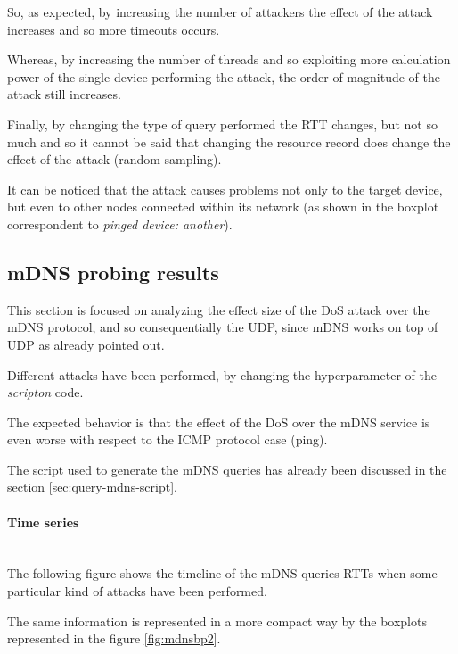 \documentclass[fleqn, 11pt]{SelfArx} %
\begin{document}
So, as expected, by increasing the number of attackers the effect of the attack increases and so more timeouts occurs.

Whereas, by increasing the number of threads and so exploiting more calculation power of the single device performing the attack, the order of magnitude of the attack still increases.

Finally, by changing the type of query performed the RTT changes, but not so much and so it cannot be said that changing the resource record does change the effect of the attack (random sampling).

It can be noticed that the attack causes problems not only to the target device, but even to other nodes connected within its network  (as shown in the boxplot correspondent to {\it{pinged device: another}}).
\subsection{mDNS probing results}
This section is focused on analyzing the effect size of the DoS attack over the mDNS protocol, and so consequentially the UDP, since mDNS works on top of UDP as already pointed out.

Different attacks have been performed, by changing the hyperparameter of the {\it{scripton}} code.

The expected behavior is that the effect of the DoS over the mDNS service is even worse with respect to the ICMP protocol case (ping).

The script used to generate the mDNS queries has already been discussed in the section \ref{sec:query-mdns-script}.
\paragraph{Time series}\mbox{}\\
The following figure shows the timeline of the mDNS queries RTTs when some particular kind of attacks have been performed.

The same information is represented in a more compact way by the boxplots represented in the figure \ref{fig:mdnsbp2}.
\end{document}

